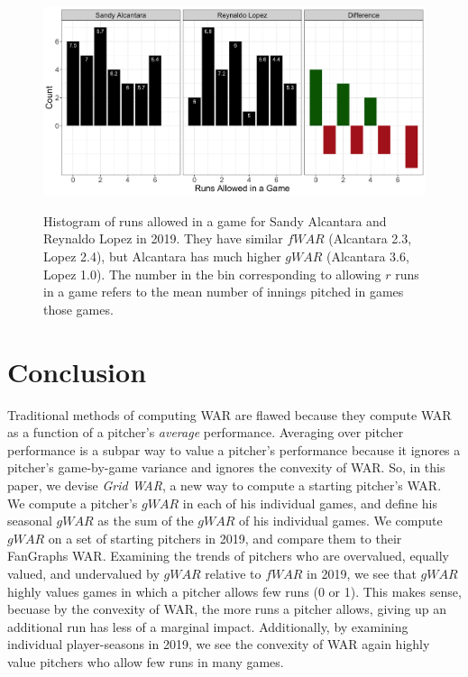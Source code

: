 \documentclass[12pt]{article}
\begin{document}
\begin{figure}[t!]
\centering
\caption{Histogram of runs allowed in a game for Sandy Alcantara and Reynaldo Lopez in 2019. They have similar $fWAR$ (Alcantara 2.3, Lopez 2.4), but Alcantara has much higher $gWAR$ (Alcantara 3.6, Lopez 1.0). The number in the bin corresponding to allowing $r$ runs in a game refers to the mean number of innings pitched in games those games.} 
\includegraphics[width=15cm]{../writeup_plots/p5_2019.png}
\label{fig:p5}
\end{figure}






\clearpage

\section{Conclusion}

Traditional methods of computing WAR are flawed because they compute WAR as a function of a pitcher's \textit{average} performance. Averaging over pitcher performance is a subpar way to value a pitcher's performance because it ignores a pitcher's game-by-game variance and ignores the convexity of WAR. So, in this paper, we devise \textit{Grid WAR}, a new way to compute a starting pitcher's WAR. We compute a pitcher's $gWAR$ in each of his individual games, and define his seasonal $gWAR$ as the sum of the $gWAR$ of his individual games. We compute $gWAR$ on a set of starting pitchers in 2019, and compare them to their FanGraphs WAR. Examining the trends of pitchers who are overvalued, equally valued, and undervalued by $gWAR$ relative to $fWAR$ in 2019, we see that $gWAR$ highly values games in which a pitcher allows few runs (0 or 1). This makes sense, becuase by the convexity of WAR, the more runs a pitcher allows, giving up an additional run has less of a marginal impact. Additionally, by examining individual player-seasons in 2019, we see the convexity of WAR again highly value pitchers who allow few runs in many games. 
\end{document}

